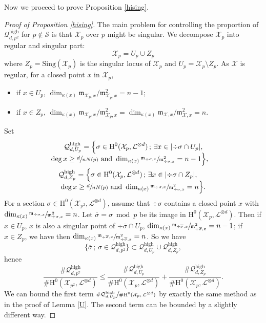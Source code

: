 \documentclass[JEP,XML,SOM,Unicode,published]{cedram}
\newcommand{\sep}{\,;\,}
\theoremstyle{plain}
\theoremstyle{definition}
\newcommand{\ho}{\mathrm{H}}
\newcommand{\m}{\mathfrak{m}}
\newcommand{\X}{\mathcal{X}}
\newcommand{\li}{\mathcal{L}}
\begin{document}
Now we proceed to prove Proposition \ref{hising}.
\begin{proof}[Proof of Proposition \ref{hising}]
The main problem for controlling the proportion of $\mathcal{Q}_{d,p^2}^{\mathrm{high}}$ for $p\not\in \mathcal{S}$ is that $\X_{p}$ over $p$ might be singular. We decompose $\X_p$ into regular and singular part:\vspace*{-3pt}
\[
\X_p=U_p\cup Z_p
\]
where $Z_p=\mathrm{Sing}(\X_p)$ is the singular locus of $\X_p$ and $U_p=\X_p\setminus Z_p$. As $\X$ is regular, for a closed point $x$ in $\X_p$,
\begin{itemize}
\item
if $x\in U_p$, $\dim_{\kappa(x)}\mathfrak{m}_{\X_p, x}/\mathfrak{m}^2_{\X_p, x}=n-1$;
\item
if $x\in Z_p$, $\dim_{\kappa(x)}\mathfrak{m}_{\X_p, x}/\mathfrak{m}^2_{\X_p, x}=\dim_{\kappa(x)}\mathfrak{m}_{\X, x}/\mathfrak{m}^2_{\X, x}=n$.
\end{itemize}
Set\vspace*{-3pt}
\begin{multline*}
\mathcal{Q}_{d,U_p}^{\mathrm{high}}= \Bigl\{ \sigma\in \ho^0(\X_{p}, \li^{\otimes d})\sep \exists x\in |{\div\sigma\cap U_p}|,\\[-5pt]
\shoveright{\deg x\geq \sfrac{d}{nN(p)}\text{ and } \dim_{\kappa(x)}\sfrac{\m_{\div \sigma,x}}{\m^2_{\div \sigma, x}}=n-1 \Bigr\},}\\
\shoveleft{\mathcal{Q}_{d,Z_p}^{\mathrm{high}}= \Bigl\{ \sigma\in \ho^0(\X_{p}, \li^{\otimes d})\sep \exists x\in |{\div\sigma\cap Z_p}|,}\\[-5pt]
\deg x\geq \sfrac{d}{nN(p)}\text{ and } \dim_{\kappa(x)}\sfrac{\m_{\div \sigma,x}}{\m^2_{\div \sigma, x}}=n \Bigr\}.
\end{multline*}
For a section $\sigma\in \ho^0(\X_{p^2}, \li^{\otimes d})$, assume that $\div \sigma$ contains a closed point $x$ with $\dim_{\kappa(x)}\sfrac{\m_{\div \sigma,x}}{\m^2_{\div \sigma, x}}=n$. Let $\overline{\sigma}=\sigma \bmod p$ be its image in $\ho^0(\X_{p}, \li^{\otimes d})$. Then if $x\in U_p$, $x$ is also a singular point of $\div \overline{\sigma}\cap U_p$, \ie $\dim_{\kappa(x)}\sfrac{\m_{\div \overline{\sigma},x}}{\m^2_{\div \overline{\sigma}, x}}=n-1$; if $x\in Z_p$, we have then $\dim_{\kappa(x)}\sfrac{\m_{\div \overline{\sigma},x}}{\m^2_{\div \overline{\sigma}, x}}=n$. So we have
\[
\{ \overline{\sigma}\sep \sigma \in \mathcal{Q}_{d,p^2}^{\mathrm{high}} \}\subset \mathcal{Q}_{d,U_p}^{\mathrm{high}}\cup \mathcal{Q}_{d,Z_p}^{\mathrm{high}},
\]
hence\vspace*{-3pt}
\[
\frac{\#\mathcal{Q}_{d,p^2}^{\mathrm{high}}}{\#\ho^0(\X_{p^2}, \li^{\otimes d})}\leq \frac{\#\mathcal{Q}_{d,U_p}^{\mathrm{high}}}{\#\ho^0(\X_{p}, \li^{\otimes d})}+\frac{\#\mathcal{Q}_{d,Z_p}^{\mathrm{high}}}{\#\ho^0(\X_{p}, \li^{\otimes d})}.
\]
We can bound the first term $\sfrac{\#\mathcal{Q}_{d,U_p}^{\mathrm{high}}}{\#\ho^0(\X_{p}, \li^{\otimes d})}$ by exactly the same method as in the proof of Lemma \ref{U}. The second term can be bounded by a slightly different way.


\end{proof}
\end{document}
